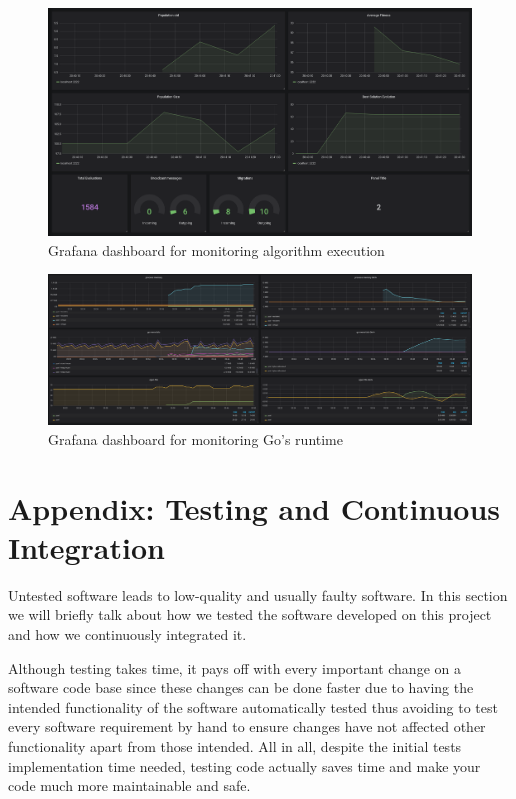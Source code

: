 \begin{figure}[h!]
		\centering
    	\includegraphics[width=\linewidth]{assets/images/grafana-1.png}
    	\caption{Grafana dashboard for monitoring algorithm execution}
    	\label{fig:grafana-1}
\end{figure}

\begin{figure}[h!]
		\centering
    	\includegraphics[width=\linewidth]{assets/images/grafana-2.png}
    	\caption{Grafana dashboard for monitoring Go's runtime}
    	\label{fig:grafana-2}
\end{figure}

\newpage
\section{Appendix: Testing and Continuous Integration}
Untested software leads to low-quality and usually faulty software. In this section we will briefly talk about how we tested the software developed on this project and how we continuously integrated it.

Although testing takes time, it pays off with every important change on a software code base since these changes can be done faster due to having the intended functionality of the software automatically tested thus avoiding to test every software requirement by hand to ensure changes have not affected other functionality apart from those intended. All in all, despite the initial tests implementation time needed, testing code actually saves time and make your code much more maintainable and safe.

